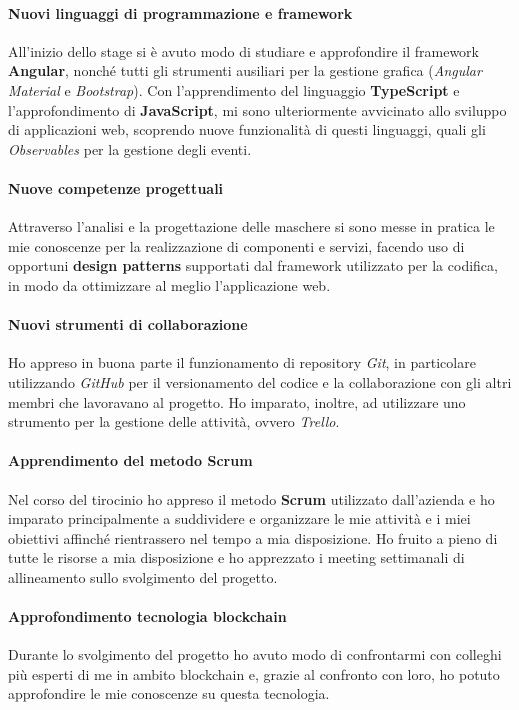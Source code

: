 \paragraph{\textbf{Nuovi linguaggi di programmazione e framework}}
All'inizio dello stage si è avuto modo di studiare e approfondire il framework \textbf{Angular}, nonché tutti gli strumenti ausiliari per la gestione grafica (\textit{Angular Material} e \textit{Bootstrap}). Con l'apprendimento del linguaggio \textbf{TypeScript} e l'approfondimento di \textbf{JavaScript}, mi sono ulteriormente avvicinato allo sviluppo di applicazioni web, scoprendo nuove funzionalità di questi linguaggi, quali gli \textit{Observables} per la gestione degli eventi.

\paragraph{\textbf{Nuove competenze progettuali}}
Attraverso l'analisi e la progettazione delle maschere si sono messe in pratica le mie conoscenze per la realizzazione di componenti e servizi, facendo uso di opportuni \textbf{design patterns} supportati dal framework utilizzato per la codifica, in modo da ottimizzare al meglio l'applicazione web.

\paragraph{\textbf{Nuovi strumenti di collaborazione}}
Ho appreso in buona parte il funzionamento di repository \textit{Git}, in particolare utilizzando \textit{GitHub} per il versionamento del codice e la collaborazione con gli altri membri che lavoravano al progetto. Ho imparato, inoltre, ad utilizzare uno strumento per la gestione delle attività, ovvero \textit{Trello}.

\paragraph{\textbf{Apprendimento del metodo Scrum}}
Nel corso del tirocinio ho appreso il metodo \textbf{Scrum} utilizzato dall'azienda e ho imparato principalmente a suddividere e organizzare le mie attività e i miei obiettivi affinché rientrassero nel tempo a mia disposizione. Ho fruito a pieno di tutte le risorse a mia disposizione e ho apprezzato i meeting settimanali di allineamento sullo svolgimento del progetto.

\paragraph{\textbf{Approfondimento tecnologia blockchain}}
Durante lo svolgimento del progetto ho avuto modo di confrontarmi con colleghi più esperti di me in ambito blockchain e, grazie al confronto con loro, ho potuto approfondire le mie conoscenze su questa tecnologia.

